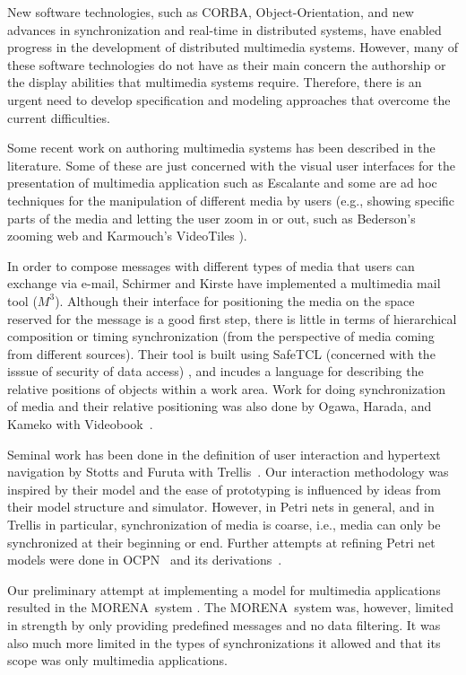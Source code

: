 \documentclass[twocolumn,10pt]{article}
\newcommand{\morena}{{MORENA}}
\begin{document}
New software technologies, such as CORBA, Object-Orientation, and new
advances in synchronization and real-time in distributed systems, have
enabled progress in the development of distributed multimedia systems.
However, many of these software technologies do not have as their main
concern the authorship or the display abilities that
multimedia systems require.  Therefore, there is an urgent need to
develop specification and modeling approaches that overcome the
current difficulties.

Some recent work on authoring multimedia systems has been described in
the literature.  Some of these are just concerned with the visual user
interfaces for the presentation of multimedia application such as
Escalante \cite{mcw:framework} and some are ad hoc techniques for the
manipulation of different media by users (e.g., showing specific parts
of the media and letting the user zoom in or out, such as Bederson's
zooming web \cite{bed:zoomweb} and Karmouch's VideoTiles
\cite{fal:mmnews}).

In order to compose messages with different types of media that users
can exchange via e-mail, Schirmer and Kirste \cite{sch:mmmail} have
implemented a multimedia mail tool ($M^3$).  Although their interface
for positioning the media on the space reserved for the message is a
good first step, there is little in terms of hierarchical composition
or timing synchronization (from the perspective of media coming from
different sources).  Their tool is built using SafeTCL (concerned with
the isssue of security of data access) \cite{bor:mail}, and incudes a
language for describing the relative positions of objects within a
work area.  Work for doing synchronization of media and their
relative positioning was also done by Ogawa, Harada, and Kameko with
Videobook~\cite{oga:videobook}.

Seminal work has been done in the definition of user interaction
and hypertext navigation by Stotts and Furuta with
Trellis~\cite{sto:tois}.  Our interaction methodology was inspired by
their model and the ease of prototyping is influenced by ideas from
their model structure and simulator.  However, in Petri nets in
general, and in Trellis in particular, synchronization of media is
coarse, i.e., media can only be synchronized at their beginning or
end.  Further attempts at refining Petri net models were done in
OCPN~\cite{lit:ocpn} and its derivations~\cite{qaz:xocpn,pra:aocpn}.

Our preliminary attempt at implementing a model for multimedia
applications resulted in the \morena\ system
\cite{bot:morena,bot:patScenario}.  The \morena\ system was, however,
limited in strength by only providing predefined messages and no data
filtering.  It was also much more limited in the types of
synchronizations it allowed and that its scope was only multimedia
applications.
\end{document}
